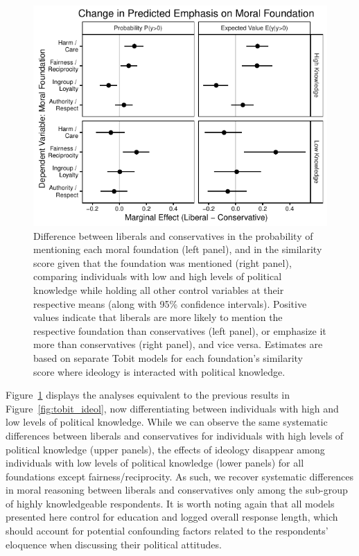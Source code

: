 \documentclass[12pt]{article}
\begin{document}
\begin{figure}[ht]\centering
\includegraphics{../calc/fig/tobit_ideol_know.pdf}
\caption{Difference between liberals and conservatives in the probability of mentioning each moral foundation (left panel), and in the similarity score given that the foundation was mentioned (right panel), comparing individuals with low and high levels of political knowledge while holding all other control variables at their respective means (along with 95\% confidence intervals). Positive values indicate that liberals are more likely to mention the respective foundation than conservatives (left panel), or emphasize it more than conservatives (right panel), and vice versa. Estimates are based on separate Tobit models for each foundation's similarity score where ideology is interacted with political knowledge.}\label{fig:tobit_ideol_know}
\end{figure}

Figure~\ref{fig:tobit_ideol_know} displays the analyses equivalent to the previous results in Figure~\ref{fig:tobit_ideol}, now differentiating between individuals with high and low levels of political knowledge. While we can observe the same systematic differences between liberals and conservatives for individuals with high levels of political knowledge (upper panels), the effects of ideology disappear among individuals with low levels of political knowledge (lower panels) for all foundations except fairness/reciprocity. As such, we recover systematic differences in moral reasoning between liberals and conservatives only among the sub-group of highly knowledgeable respondents. It is worth noting again that all models presented here control for education and logged overall response length, which should account for potential confounding factors related to the respondents' eloquence when discussing their political attitudes.
\end{document}

